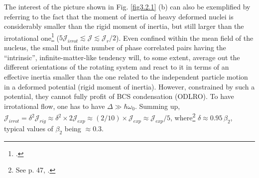  
 The interest of the  picture shown in Fig. \ref{fig3.2.1} (b) can also be exemplified by referring to the fact that the moment of inertia of heavy deformed nuclei is considerably smaller than the rigid moment of inertia, but still larger than the irrotational one\footnote{\cite{Bohr:75,Belyaev:59,Belyaev:13}.} ($5\mathcal J_{irrot}\lesssim\mathcal J\lesssim  \mathcal J_r/2$). Even confined within the mean field of the nucleus, 
  the small but finite number   of phase correlated pairs  having the ``intrinsic'', infinite-matter-like tendency will, to some extent, average out the different orientations of the rotating system and react to it in terms of an effective inertia smaller than the one related to the independent particle motion in a deformed potential (rigid moment of inertia). However, constrained by such a potential, they cannot fully profit of BCS  condensation 
   (ODLRO). To have irrotational flow, one has to have $\Delta\gg \hbar\omega_0$. 	
 	Summing up, $\mathcal J_{irrot}=\delta^2\mathcal J_{rig}\approx\delta^2\times2\mathcal J_{exp}\approx(2/10)\times\mathcal J_{exp}\approx\mathcal J_{exp}/5$, where\footnote{See p. 47, \cite{Bohr:75}.} $\delta\approx0.95\,\beta_2$, typical values of $\beta_2$ being $\approx0.3$. 

